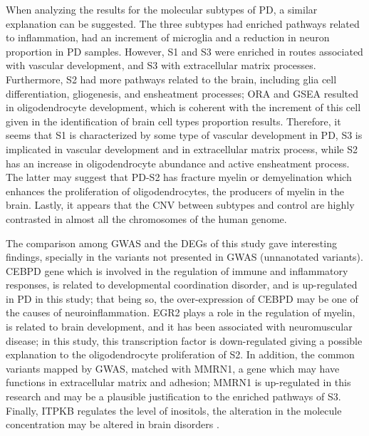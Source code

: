 When analyzing the results for the molecular subtypes of PD, a similar explanation can be suggested. The three subtypes had enriched pathways related to inflammation, had an increment of microglia and a reduction in neuron proportion in PD samples. However, S1 and S3 were enriched in routes associated with vascular development, and S3 with extracellular matrix processes. Furthermore, S2 had more pathways related to the brain, including glia cell differentiation, gliogenesis, and ensheatment processes; ORA and GSEA resulted in oligodendrocyte development, which is coherent with the increment of this cell given in the identification of brain cell types proportion results. Therefore, it seems that S1 is characterized by some type of vascular development in PD, S3 is implicated in vascular development and in extracellular matrix process, while S2 has an increase in oligodendrocyte abundance and active ensheatment process. The latter may suggest that PD-S2 has fracture myelin or demyelination which enhances the proliferation of oligodendrocytes, the producers of myelin in the brain. Lastly, it appears that the CNV between subtypes and control are highly contrasted in almost all the chromosomes of the human genome.

The comparison among GWAS and the DEGs of this study gave interesting findings, specially in the variants not presented in GWAS (unnanotated variants). CEBPD gene which is involved in the regulation of immune and inflammatory responses, is related to developmental coordination disorder, and is up-regulated in PD in this study; that being so, the over-expression of CEBPD may be one of the causes of neuroinflammation. EGR2 plays a role in the regulation of myelin, is related to brain development, and it has been associated with neuromuscular disease; in this study, this transcription factor is down-regulated giving a possible explanation to the oligodendrocyte proliferation of S2. In addition, the common variants mapped by GWAS, matched with MMRN1, a gene which may have functions in extracellular matrix and adhesion; MMRN1 is up-regulated in this research and may be a plausible justification to the enriched pathways of S3. Finally, ITPKB regulates the level of inositols, the alteration in the molecule concentration may be altered in brain disorders \cite{brand}. 

